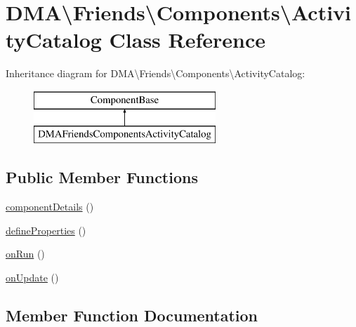 \hypertarget{classDMA_1_1Friends_1_1Components_1_1ActivityCatalog}{}\section{D\+M\+A\textbackslash{}Friends\textbackslash{}Components\textbackslash{}Activity\+Catalog Class Reference}
\label{classDMA_1_1Friends_1_1Components_1_1ActivityCatalog}
Inheritance diagram for D\+M\+A\textbackslash{}Friends\textbackslash{}Components\textbackslash{}Activity\+Catalog\+:\begin{figure}[H]
\begin{center}
\leavevmode
\includegraphics[height=2.000000cm]{d2/ddd/classDMA_1_1Friends_1_1Components_1_1ActivityCatalog}
\end{center}
\end{figure}
\subsection*{Public Member Functions}
\begin{DoxyCompactItemize}
\item 
\hyperlink{classDMA_1_1Friends_1_1Components_1_1ActivityCatalog_aa4db8e1c5f24dcc1735aa1e0ab42c050}{component\+Details} ()
\item 
\hyperlink{classDMA_1_1Friends_1_1Components_1_1ActivityCatalog_a1128398f3dca30ab7115b3b907a9a3ec}{define\+Properties} ()
\item 
\hyperlink{classDMA_1_1Friends_1_1Components_1_1ActivityCatalog_a0fe286368eec900c0a6c77ea7905a8ad}{on\+Run} ()
\item 
\hyperlink{classDMA_1_1Friends_1_1Components_1_1ActivityCatalog_a71ebda8105f758b9fa868b31f36da108}{on\+Update} ()
\end{DoxyCompactItemize}


\subsection{Member Function Documentation}
\hypertarget{classDMA_1_1Friends_1_1Components_1_1ActivityCatalog_aa4db8e1c5f24dcc1735aa1e0ab42c050}{}
